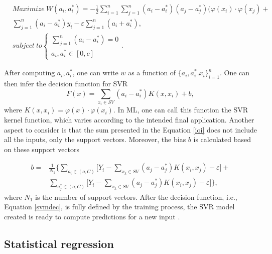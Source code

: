 \begin{equation}
\begin{split}
       & Maximize \  W(a_i, a_i^*) = -\frac{1}{2}\sum_{i=1}^{n}\sum_{j=1}^{n}(a_i-a_i^*)(a_j-a_j^*)(\varphi(x_i)\cdot \varphi(x_j) + \\
       & \sum_{j=1}^{n}(a_i-a_i^*)y_i - \varepsilon \sum_{j=1}^{n}(a_i+a_i^*),\\
       & subject \  to \begin{cases} \sum_{j=1}^{n}(a_i-a_i^*) = 0 \\ a_i, a_i^* \in [0,c] \end{cases} .
\end{split}
\end{equation}

After computing $a_i, a_i^*$, one can write $w$ as a function of $\{ a_i, a_i^*. x_i\}_{i=1}^n$. One can then infer the decision function for \ac{SVR}
\begin{equation}
      F(x) = \sum_{x_i \in SV} (a_i-a_i^*)K(x, x_i)+b , 
      \label{ioi}
\end{equation}
 where $K(x, x_i) = \varphi(x)\cdot\varphi(x_i)$. In \ac{ML}, one can call this function the \ac{SVR} kernel function, which varies according to the intended final application. Another aspect to consider is that the sum presented in the Equation \ref{ioi} does not include all the inputs, only the support vectors. Moreover, the bias $b$ is calculated based on these support vectors

\begin{equation}
\begin{split}
       b = & \frac{1}{N_1} \Bigg\{ \sum_{a_i \in (o,C)} \Bigg[ Y_i-\sum_{x_k\in SV}(a_j-a_j^*)K(x_i, x_j) - \varepsilon \Bigg] + \\
           & \sum_{a^*_j \in (o,C)}\Bigg[Y_i-\sum_{x_k\in SV}(a_j-a_j^*)K(x_i, x_j) - \varepsilon\Bigg] \Bigg\},
\end{split}
\end{equation}
 where $N_1$ is the number of support vectors. After the decision function, i.e., Equation \ref{svmdec}, is fully defined by the training process, the \ac{SVR} model created is ready to compute predictions for a new input \cite{review2017}.
 

\subsection{Statistical regression}

